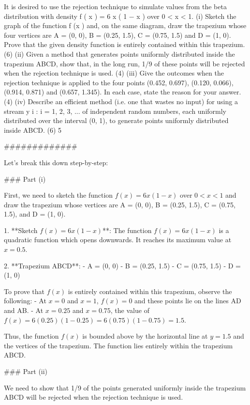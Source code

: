 It is desired to use the rejection technique to simulate values from the beta distribution
with density f ( x ) = 6 x ( 1 − x ) over 0 < x < 1.
(i) Sketch the graph of the function f (x ) and, on the same diagram, draw the
trapezium whose four vertices are A = (0, 0), B = (0.25, 1.5), C = (0.75, 1.5)
and D = (1, 0). Prove that the given density function is entirely contained
within this trapezium.
(6)
(ii) Given a method that generates points uniformly distributed inside the
trapezium ABCD, show that, in the long run, 1/9 of these points will be
rejected when the rejection technique is used.
(4)
(iii) Give the outcomes when the rejection technique is applied to the four points
(0.452, 0.697), (0.120, 0.066), (0.914, 0.871) and (0.657, 1.345). In each case,
state the reason for your answer.
(4)
(iv) Describe an efficient method (i.e. one that wastes no input) for using a stream
{y i : i = 1, 2, 3, ...} of independent random numbers, each uniformly distributed
over the interval (0, 1), to generate points uniformly distributed inside ABCD.
(6)
5

#############

Let's break this down step-by-step:

### Part (i)

First, we need to sketch the function \( f(x) = 6x(1-x) \) over \( 0 < x < 1 \) and draw the trapezium whose vertices are A = (0, 0), B = (0.25, 1.5), C = (0.75, 1.5), and D = (1, 0).

1. **Sketch \( f(x) = 6x(1-x) \)**:
   The function \( f(x) = 6x(1-x) \) is a quadratic function which opens downwards. It reaches its maximum value at \( x = 0.5 \).

2. **Trapezium ABCD**:
   - A = (0, 0)
   - B = (0.25, 1.5)
   - C = (0.75, 1.5)
   - D = (1, 0)

To prove that \( f(x) \) is entirely contained within this trapezium, observe the following:
- At \( x = 0 \) and \( x = 1 \), \( f(x) = 0 \) and these points lie on the lines AD and AB.
- At \( x = 0.25 \) and \( x = 0.75 \), the value of \( f(x) = 6(0.25)(1-0.25) = 6(0.75)(1-0.75) = 1.5 \).

Thus, the function \( f(x) \) is bounded above by the horizontal line at \( y = 1.5 \) and the vertices of the trapezium. The function lies entirely within the trapezium ABCD.

### Part (ii)

We need to show that 1/9 of the points generated uniformly inside the trapezium ABCD will be rejected when the rejection technique is used.

